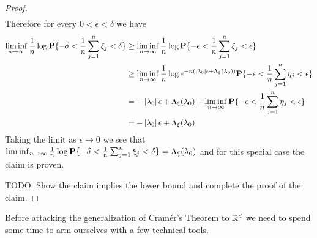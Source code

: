 \begin{proof}
\begin{align*}
\end{align*}
Therefore for every $0 < \epsilon < \delta$ we have
\begin{align*}
\liminf_{n \to \infty} \frac{1}{n} \log \textbf{P}\{ -\delta < \frac{1}{n} \sum_{j=1}^n \xi_j < \delta\} 
&\geq \liminf_{n \to \infty} \frac{1}{n} \log \textbf{P}\{ -\epsilon < \frac{1}{n} \sum_{j=1}^n \xi_j < \epsilon\} \\
&\geq \liminf_{n \to \infty} \frac{1}{n} \log e^{-n(\left \vert \lambda_0 \right \vert \epsilon + \Lambda_\xi(\lambda_0))} \textbf{P}\{-\epsilon < \frac{1}{n} \sum_{j=1}^n \eta_j < \epsilon\} \\
&=-\left \vert \lambda_0 \right \vert \epsilon + \Lambda_\xi(\lambda_0) + \liminf_{n \to \infty} \textbf{P}\{-\epsilon < \frac{1}{n} \sum_{j=1}^n \eta_j < \epsilon\} \\
&= -\left \vert \lambda_0 \right \vert \epsilon + \Lambda_\xi(\lambda_0) 
\end{align*}
Taking the limit as $\epsilon \to 0$ we see that $\liminf_{n \to \infty} \frac{1}{n} \log \textbf{P}\{ -\delta < \frac{1}{n} \sum_{j=1}^n \xi_j < \delta\} = \Lambda_\xi(\lambda_0)$ and for
this special case the claim is proven.

TODO: Show the claim implies the lower bound and complete the proof of the claim.
\end{proof}

Before attacking the generalization of Cram\'{e}r's Theorem to $\mathbb{R}^d$ we need to spend some time to arm ourselves with a few technical tools.

